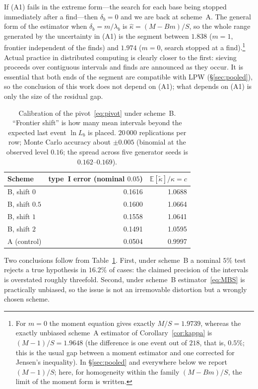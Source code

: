 \documentclass[11pt,a4paper]{article}
\theoremstyle{plain}
\theoremstyle{remark}
\begin{document}
\medskip
\noindent If (A1) fails in the extreme form---the search for each base being
stopped immediately after a find---then $\delta_b=0$ and we are back at
scheme~A. The general form of the estimator when $\delta_b=m/\lambda_b$ is
$\hat\kappa=(M-Bm)/S$, so the whole range generated by the uncertainty in (A1)
is the segment between $1.838$ ($m=1$, frontier independent of the finds) and
$1.974$ ($m=0$, search stopped at a find).\footnote{%
For $m=0$ the moment equation gives exactly $M/S=1.9739$, whereas the exactly
unbiased scheme~A estimator of Corollary~\ref{cor:kappa} is $(M-1)/S=1.9648$
(the difference is one event out of $218$, that is, $0.5\%$; this is the usual
gap between a moment estimator and one corrected for Jensen's inequality). In
\S\ref{sec:pooled} and everywhere below we report $(M-1)/S$; here, for
homogeneity within the family $(M-Bm)/S$, the limit of the moment form is
written.}
Actual practice in distributed computing is clearly closer to the first: sieving
proceeds over contiguous intervals and finds are announced as they occur. It is
essential that both ends of the segment are compatible with LPW
(\S\ref{sec:pooled}), so the conclusion of this work does not depend on (A1);
what depends on (A1) is only the size of the residual gap.

\begin{table}[t]
\centering
\caption{Calibration of the pivot~\eqref{eq:pivot} under scheme~B. ``Frontier
shift'' is how many mean intervals beyond the expected last event $\ln L_b$ is
placed. $20\,000$ replications per row; Monte Carlo accuracy about $\pm0.005$
(binomial at the observed level $0.16$; the spread across five generator seeds
is $0.162$--$0.169$).}
\label{tab:calib}
\small
\begin{tabular}{lrr}
\toprule
Scheme & type~I error (nominal $0.05$) & $\mathbb E[\tilde\kappa]/\kappa=c$\\
\midrule
B, shift $0$ & 0.1616 & 1.0688\\
B, shift $0.5$ & 0.1600 & 1.0664\\
B, shift $1$ & 0.1558 & 1.0641\\
B, shift $2$ & 0.1491 & 1.0595\\
A (control) & 0.0504 & 0.9997\\
\bottomrule
\end{tabular}
\end{table}

Two conclusions follow from Table~\ref{tab:calib}. First, under scheme~B a
nominal $5\%$ test rejects a true hypothesis in $16.2\%$ of cases: the claimed
precision of the intervals is overstated roughly threefold. Second, under
scheme~B estimator~\eqref{eq:MBS} is practically unbiased, so the issue is not
an irremovable distortion but a wrongly chosen scheme.
\end{document}
